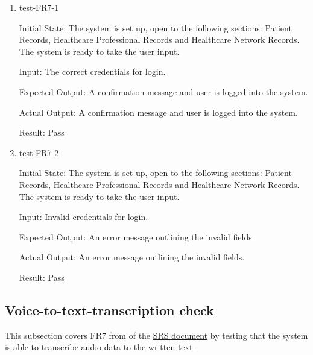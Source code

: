 \documentclass[12pt, titlepage]{article}
\begin{document}
\begin{enumerate}

  \item{test-FR7-1} \label{test-FR7-1}
  
  Initial State: The system is set up, open to the following sections: Patient Records, Healthcare Professional Records and Healthcare Network Records. The system is ready to take the user input.

  Input: The correct credentials for login.

  Expected Output: A confirmation message and user is logged into the system.

  Actual Output: A confirmation message and user is logged into the system.

  Result: Pass


  \item{test-FR7-2} \label{test-FR7-2}

  Initial State: The system is set up, open to the following sections: Patient Records, Healthcare Professional Records and Healthcare Network Records. The system is ready to take the user input.

  Input: Invalid credentials for login.

  Expected Output: An error message outlining the invalid fields.

  Actual Output: An error message outlining the invalid fields.

  Result: Pass

\end{enumerate}

\subsection{Voice-to-text-transcription check} \label{section:3.5}

This subsection covers FR7 from of the \href{https://github.com/Inreet-Kaur/capstone/blob/main/docs/SRS/SRS.pdf} {SRS document} by testing that the system is able to transcribe audio data to the written text.
\end{document}

